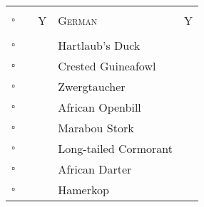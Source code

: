 \documentclass{article}
\newcommand{\maxnum}{100.00}
\newlength{\maxlen}
\newcommand{\databar}[2][blue!25]{%
  \settowidth{\maxlen}{\maxnum}%
  \addtolength{\maxlen}{\tabcolsep}%
  \FPeval\result{round(#2/\maxnum:4)}%
  \rlap{\color{blue!25}\hspace*{-.5\tabcolsep}\rule[-.05\ht\strutbox]{\result\maxlen}{.95\ht\strutbox}}%
  \makebox[\dimexpr\maxlen-\tabcolsep][r]{#2}%
}
\begin{document}
\begin{center}
\begin{tabularx}{\textwidth}{cccXc}\hline
\\[0.5ex]
\textsc{ \large{\normalsize{$\square$\hspace{1ex} }}} 	 & \textsc{ \large{\normalsize{\underline{\hspace{1ex}}\hspace{1ex}}}} 	 & \textsc{ \large{Y}} 	 & \textsc{ \large{German}} 	 & \textsc{ \large{ Y}}\\\\[0.5ex]
\hline
$\square$\hspace{1ex}  	 & \underline{\hspace{1ex}}\hspace{1ex} 	 & \databar{2.1} 	 & Hartlaub's Duck 	 & \databar{2.1} \\ 
$\square$\hspace{1ex}  	 & \underline{\hspace{1ex}}\hspace{1ex} 	 & \databar{2.1} 	 & Crested Guineafowl 	 & \databar{2.1} \\ 
$\square$\hspace{1ex}  	 & \underline{\hspace{1ex}}\hspace{1ex} 	 & \databar{1.7} 	 & Zwergtaucher 	 & \databar{1.7} \\ 
$\square$\hspace{1ex}  	 & \underline{\hspace{1ex}}\hspace{1ex} 	 & \databar{1.0} 	 & African Openbill 	 & \databar{1.0} \\ 
$\square$\hspace{1ex}  	 & \underline{\hspace{1ex}}\hspace{1ex} 	 & \databar{2.6} 	 & Marabou Stork 	 & \databar{2.6} \\ 
$\square$\hspace{1ex}  	 & \underline{\hspace{1ex}}\hspace{1ex} 	 & \databar{3.6} 	 & Long-tailed Cormorant 	 & \databar{3.6} \\ 
$\square$\hspace{1ex}  	 & \underline{\hspace{1ex}}\hspace{1ex} 	 & \databar{2.6} 	 & African Darter 	 & \databar{2.6} \\ 
$\square$\hspace{1ex}  	 & \underline{\hspace{1ex}}\hspace{1ex} 	 & \databar{1.4} 	 & Hamerkop 	 & \databar{1.4} \\ 

\end{tabularx}
\end{center}
\end{document}
